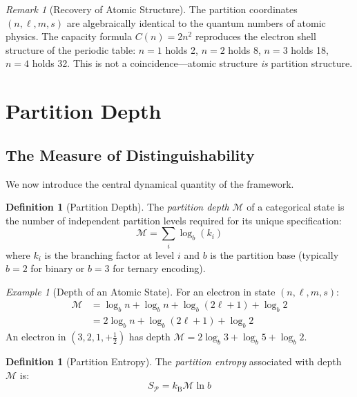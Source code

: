 \documentclass[twocolumn,10pt,a4paper]{article}
\theoremstyle{plain}
\theoremstyle{definition}
\newtheorem{definition}[theorem]{Definition}
\theoremstyle{remark}
\newtheorem{remark}[theorem]{Remark}
\newtheorem{example}[theorem]{Example}
\newcommand{\kB}{k_{\mathrm{B}}}
\newcommand{\Depth}{\mathcal{M}}
\newcommand{\Partition}{\mathcal{P}}
\begin{document}
\begin{remark}[Recovery of Atomic Structure]
The partition coordinates $(n, \ell, m, s)$ are algebraically identical to the quantum numbers of atomic physics. The capacity formula $C(n) = 2n^2$ reproduces the electron shell structure of the periodic table: $n=1$ holds 2, $n=2$ holds 8, $n=3$ holds 18, $n=4$ holds 32. This is not a coincidence---atomic structure \emph{is} partition structure.
\end{remark}

\section{Partition Depth}
\label{sec:depth}

\subsection{The Measure of Distinguishability}

We now introduce the central dynamical quantity of the framework.

\begin{definition}[Partition Depth]
\label{def:depth}
The \emph{partition depth} $\Depth$ of a categorical state is the number of independent partition levels required for its unique specification:
\begin{equation}
    \Depth = \sum_{i} \log_b(k_i)
\end{equation}
where $k_i$ is the branching factor at level $i$ and $b$ is the partition base (typically $b = 2$ for binary or $b = 3$ for ternary encoding).
\end{definition}

\begin{example}[Depth of an Atomic State]
For an electron in state $(n, \ell, m, s)$:
\begin{align}
    \Depth &= \log_b n + \log_b n + \log_b(2\ell + 1) + \log_b 2 \nonumber \\
           &= 2\log_b n + \log_b(2\ell + 1) + \log_b 2
\end{align}
An electron in $(3, 2, 1, +\tfrac{1}{2})$ has depth $\Depth = 2\log_b 3 + \log_b 5 + \log_b 2$.
\end{example}

\begin{definition}[Partition Entropy]
\label{def:partition_entropy}
The \emph{partition entropy} associated with depth $\Depth$ is:
\begin{equation}
    S_\Partition = \kB \Depth \ln b
\end{equation}
\end{definition}
\end{document}
